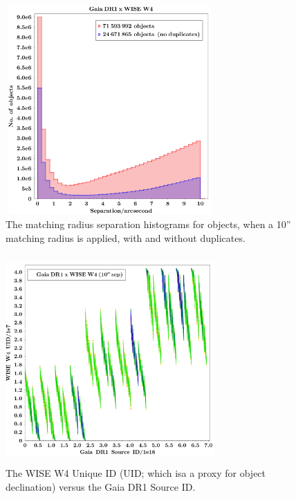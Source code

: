 \documentclass[11pt,a4paper]{article}
\begin{document}
\begin{figure}
    \centering
    \includegraphics[height=8.0cm,width=8.0cm]
    {../../Gaia/plots/GaiaDR1xWISEW4_10asDupes_histo.png}
    \caption[The matching radius separation histograms for objects, with and without duplicates.]
    {The matching radius separation histograms for objects, when a 10'' matching radius is applied, with and without duplicates.}
    \label{fig:fig3}
\end{figure}

\begin{figure}
    \centering
    \includegraphics[height=8.0cm,width=8.0cm]
    {../../Gaia/plots/Gaia_sourceID_vs_WW4C_uid.png}
    \caption[The WISE W4 Unique ID (UID; which isa a proxy for object declination) versus the Gaia DR1 Source ID.]
    {The WISE W4 Unique ID (UID; which isa a proxy for object declination) versus the Gaia DR1 Source ID.}                    
    \label{fig:fig4}
\end{figure}
\end{document}
